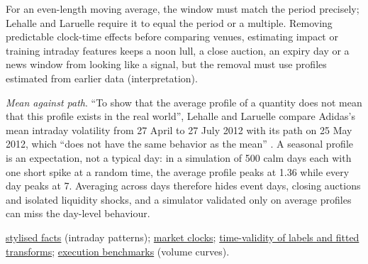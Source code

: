 \begin{qfmethod}
 For an even-length moving average, the window must match the period precisely; Lehalle and Laruelle require it to equal the period or a multiple. Removing predictable clock-time effects before comparing venues, estimating impact or training intraday features keeps a noon lull, a close auction, an expiry day or a news window from looking like a signal, but the removal must use profiles estimated from earlier data (interpretation).

\emph{Mean against path}. ``To show that the average profile of a quantity does not mean that this profile exists in the real world'', Lehalle and Laruelle compare Adidas's mean intraday volatility from 27 April to 27 July 2012 with its path on 25 May 2012, which ``does not have the same behavior as the mean'' \citep[app.~A, sec.~A.14.1, pp.~318--320, Figure~A.27]{alpha-laruelle}. A seasonal profile is an expectation, not a typical day: in a simulation of 500 calm days each with one short spike at a random time, the average profile peaks at 1.36 while every day peaks at 7. Averaging across days therefore hides event days, closing auctions and isolated liquidity shocks, and a simulator validated only on average profiles can miss the day-level behaviour.

 \hyperref[ev:high-frequency-stylised-facts]{stylised facts} (intraday patterns); \hyperref[def:market-clocks-durations]{market clocks}; \hyperref[pit:label-weight-leakage]{time-validity of labels and fitted transforms}; \hyperref[def:execution-benchmark]{execution benchmarks} (volume curves).

\end{qfmethod}

